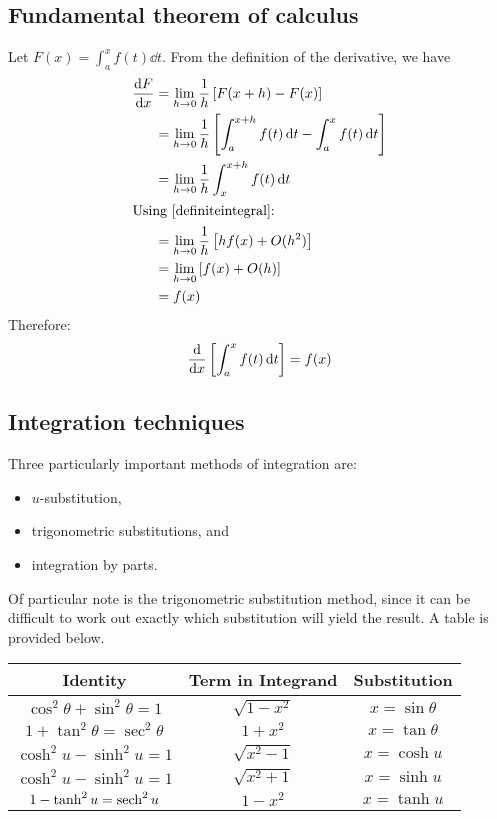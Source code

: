 \subsection{Fundamental theorem of calculus}
Let \(F(x) = \int_{a}^{x} f(t) \dd{t}\).
From the definition of the derivative, we have
\begin{align*}
	\frac{\dd{F}}{\dd{x}} & = \lim_{h \to 0} \frac{1}{h} \left[ F(x+h) - F(x) \right]                                         \\
	                      & = \lim_{h \to 0} \frac{1}{h} \left[ \int_{a}^{x+h} f(t) \dd{t} - \int_{a}^{x} f(t) \dd{t} \right] \\
	                      & = \lim_{h \to 0} \frac{1}{h} \int_{x}^{x+h} f(t) \dd{t}                                           \\
	\intertext{Using \eqref{definiteintegral}:}
	                      & = \lim_{h \to 0} \frac{1}{h} \left[ hf(x) + O(h^2) \right]                                        \\
	                      & = \lim_{h \to 0} \left[ f(x) + O(h) \right]                                                       \\
	                      & = f(x)
\end{align*}
Therefore:
\begin{equation}\label{ftc}
	\frac{\mathrm{d}}{\dd{x}} \left[ \int_{a}^{x} f(t) \dd{t} \right] = f(x)
\end{equation}

\subsection{Integration techniques}
Three particularly important methods of integration are:
\begin{itemize}
	\item \(u\)-substitution,
	\item trigonometric substitutions, and
	\item integration by parts.
\end{itemize}
Of particular note is the trigonometric substitution method, since it can be difficult to work out exactly which substitution will yield the result.
A table is provided below.

\begin{center}
	\begin{tabular}{c c c}
		Identity                              & Term in Integrand  & Substitution        \\\midrule
		\(\cos^2 \theta + \sin^2 \theta = 1\) & \(\sqrt{1 - x^2}\) & \(x = \sin \theta\) \\
		\(1 + \tan^2 \theta = \sec^2 \theta\) & \(1 + x^2\)        & \(x = \tan \theta\) \\
		\(\cosh^2 u - \sinh^2 u = 1\)         & \(\sqrt{x^2 - 1}\) & \(x = \cosh u\)     \\
		\(\cosh^2 u - \sinh^2 u = 1\)         & \(\sqrt{x^2 + 1}\) & \(x = \sinh u\)     \\
		\(1 - \tanh^2 u = \sech^2 u\)         & \(1 - x^2\)        & \(x = \tanh u\)
	\end{tabular}
\end{center}
